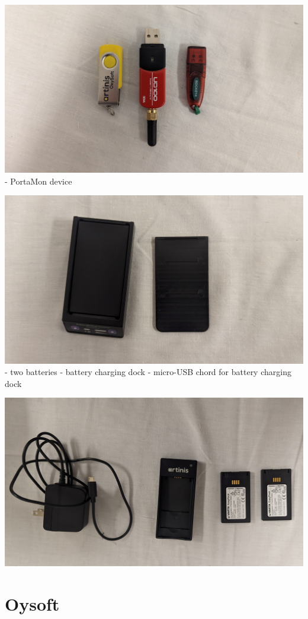 \documentclass[
]{book}
\begin{document}
\includegraphics[width=1\linewidth]{images/portamon/laptopplugins}
- PortaMon device

\includegraphics[width=1\linewidth]{images/portamon/portamonopen}
- two batteries
- battery charging dock
- micro-USB chord for battery charging dock

\includegraphics[width=1\linewidth]{images/portamon/portamonbatteriesandcharger}

\hypertarget{Oxysoft}{%
\section{Oysoft}\label{Oxysoft}}
\end{document}
